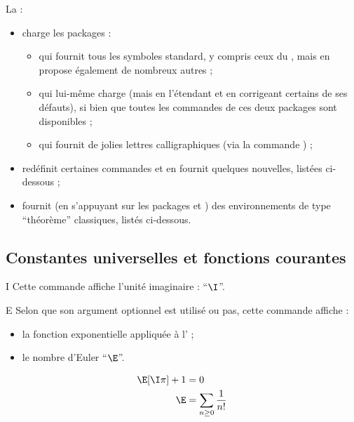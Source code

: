 \documentclass[french,nolocaltoc]{nwejmart}
\newtheorem[style=definition]{fait}
\newtheorem[title=contraventionnalisation]{ctrv}
\newtheorem[title-plural=anneaux]{anneau}
\newtheorem[title-plural=idéaux]{idéal}
\begin{document}
La \nwejmauthorcl{} :
\begin{itemize}
\item charge les packages :
  \begin{itemize}
  \item {} qui fournit tous les symboles standard, y compris
    ceux du , mais en propose également de nombreux autres ;
  \item {} qui lui-même charge  (mais en
    l'étendant et en corrigeant certains de ses défauts), si bien que toutes les
    commandes de ces deux packages sont disponibles ;
  \item {} qui fournit de jolies lettres calligraphiques (via
    la commande ) ;
  \end{itemize}
\item redéfinit certaines commandes et en fournit quelques nouvelles, listées
  ci-dessous ;
\item fournit (en s'appuyant sur les packages  et
  ) des environnements de type \enquote{théorème} classiques,
  listés ci-dessous.
\end{itemize}

\subsection{Constantes universelles et fonctions courantes}

\begin{docCommand}{I}{}
  Cette commande affiche l'unité imaginaire : \enquote{$\I$}.
\end{docCommand}

\begin{docCommand}{E}{}
 Selon que son argument optionnel est utilisé ou pas, cette commande affiche :
  \begin{itemize}
  \item la fonction exponentielle appliquée à l' ;
  \item le nombre d'Euler \enquote{$\E$}.
  \end{itemize}
\end{docCommand}

\begin{bodycode}
\begin{align}
  \E[\I\pi]+1 & = 0 \\
  \E          & = \sum_{n\geq 0} \frac{1}{n!}
\end{align}
\end{bodycode}
\end{document}
